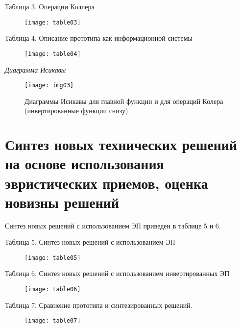 Таблица 3. Операции Коллера
\begin{figure}[h!]
    \center
    \texttt{[image: table03]}
\end{figure}

\pagebreak

Таблица 4. Описание прототипа как информационной системы
\begin{figure}[h!]
    \center
    \texttt{[image: table04]}
\end{figure}

\emph{Диаграмма Исикавы}
\begin{figure}[h!]
    \center
    \texttt{[image: img03]}
    \caption{Диаграммы Исикавы для главной функции и для операций Колера (инвертированные функции снизу).}
\end{figure}

\chapter{Синтез новых технических решений на основе использования эвристических приемов, 
    оценка новизны решений}
Синтез новых решений с использованием ЭП приведен в таблице 5 и 6.

Таблица 5. Синтез новых решений с использованием ЭП
\begin{figure}[h!]
    \center
    \texttt{[image: table05]}
\end{figure}

\pagebreak

Таблица 6. Синтез новых решений с использованием инвертированных ЭП
\begin{figure}[h!]
    \center
    \texttt{[image: table06]}
\end{figure}

\pagebreak

Таблица 7. Сравнение прототипа и синтезированных решений. 
\begin{figure}[h!]
    \center
    \texttt{[image: table07]}
\end{figure}


